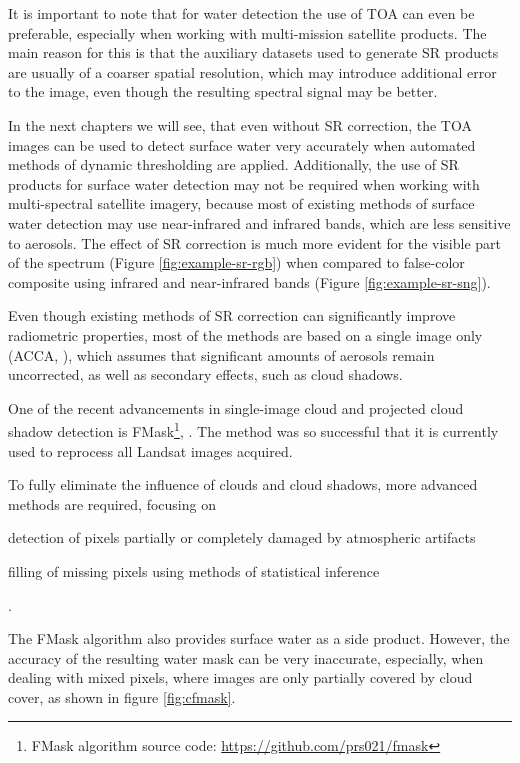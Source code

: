 It is important to note that for water detection the use of TOA can even be preferable, especially when working with multi-mission satellite products. The main reason for this is that the auxiliary datasets used to generate SR products are usually of a coarser spatial resolution, which may introduce additional error to the image, even though the resulting spectral signal may be better. 

In the next chapters we will see, that even without SR correction, the TOA images can be used to detect surface water very accurately when automated methods of dynamic thresholding are applied. Additionally, the use of SR products for surface water detection may not be required when working with multi-spectral satellite imagery, because most of existing methods of surface water detection may use near-infrared and infrared bands, which are less sensitive to aerosols. The effect of SR correction is much more evident for the visible part of the spectrum (Figure \ref{fig:example-sr-rgb}) when compared to false-color composite using infrared and near-infrared bands (Figure \ref{fig:example-sr-sng}).

Even though existing methods of SR correction can significantly improve radiometric properties, most of the methods are based on a single image only (ACCA, \citep{irish2006characterization}), which assumes that significant amounts of aerosols remain uncorrected, as well as secondary effects, such as cloud shadows.

One of the recent advancements in single-image cloud and projected cloud shadow detection is FMask\footnote{FMask algorithm source code: \url{https://github.com/prs021/fmask}}, \citep{zhu2012object, zhu2015improvement}. The method was so successful that it is currently used to reprocess all Landsat images acquired. 

To fully eliminate the influence of clouds and cloud shadows, more advanced methods are required, focusing on \begin{enumerate*}[label=(\emph{\alph*})]
	\item detection of pixels partially or completely damaged by atmospheric artifacts
	\item filling of missing pixels using methods of statistical inference
\end{enumerate*}. 

The FMask algorithm also provides surface water as a side product. However, the accuracy of the resulting water mask can be very inaccurate, especially, when dealing with mixed pixels, where images are only partially covered by cloud cover, as shown in figure \ref{fig:cfmask}.

